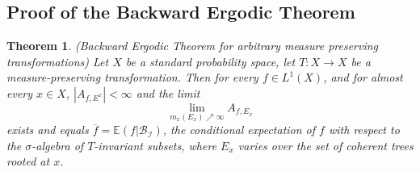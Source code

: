 \documentclass{article}
\newcommand{\abs}[1]{\left\vert#1\right\vert}
\newtheorem{theorem}{Theorem}[section]
\theoremstyle{definition}
\begin{document}
\subsection{Proof of the Backward Ergodic Theorem}
\begin{theorem}
    \label{The Theorem}(Backward Ergodic Theorem for arbitrary measure preserving transformations) Let $ X $ be a standard probability space, let $ T:X\rightarrow X $ be a measure-preserving transformation. Then for every $ f\in L^1(X) $, and for almost every $x \in X $, $ \abs{A_{f,E^x}} <\infty $ and the limit
    \[
    \lim_{m_x(E_x)\nearrow \infty} A_{f,E_x} 
    \]
    exists and equals $ \overline{f}= \mathbb{E}(f|\mathcal{B}_{\mathcal{I}}) $, the conditional expectation of $ f $ with respect to the $ \sigma $-algebra of $ T $-invariant subsets, where $ E_x$ varies over the set of coherent trees rooted at $x $.
\end{theorem}
\end{document}
